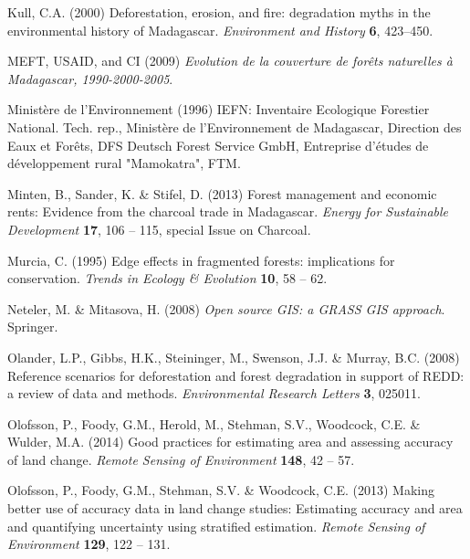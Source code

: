 \documentclass[a4paper, 12pt, leqno]{article} %
\begin{document}
\begin{thebibliography}{60}
Kull, C.A. (2000) {Deforestation, erosion, and fire: degradation myths in the
  environmental history of Madagascar}. \emph{Environment and History}
  \textbf{6}, 423--450.

{MEFT, USAID, and CI} (2009) \emph{{Evolution de la couverture de forêts
  naturelles à Madagascar, 1990-2000-2005}}.

{Ministère de l'Environnement} (1996) {IEFN: Inventaire Ecologique Forestier
  National}. Tech. rep., {Ministère de l'Environnement de Madagascar,
  Direction des Eaux et Forêts, DFS Deutsch Forest Service GmbH, Entreprise
  d'études de développement rural "Mamokatra", FTM}.

Minten, B., Sander, K. \& Stifel, D. (2013) {Forest management and economic
  rents: Evidence from the charcoal trade in Madagascar}. \emph{Energy for
  Sustainable Development} \textbf{17}, 106 -- 115, special Issue on Charcoal.

Murcia, C. (1995) Edge effects in fragmented forests: implications for
  conservation. \emph{Trends in Ecology \& Evolution} \textbf{10}, 58 -- 62.

Neteler, M. \& Mitasova, H. (2008) \emph{{Open source GIS: a GRASS GIS
  approach}}. Springer.

Olander, L.P., Gibbs, H.K., Steininger, M., Swenson, J.J. \& Murray, B.C.
  (2008) {Reference scenarios for deforestation and forest degradation in
  support of REDD: a review of data and methods}. \emph{Environmental Research
  Letters} \textbf{3}, 025011.

Olofsson, P., Foody, G.M., Herold, M., Stehman, S.V., Woodcock, C.E. \& Wulder,
  M.A. (2014) Good practices for estimating area and assessing accuracy of land
  change. \emph{Remote Sensing of Environment} \textbf{148}, 42 -- 57.

Olofsson, P., Foody, G.M., Stehman, S.V. \& Woodcock, C.E. (2013) Making better
  use of accuracy data in land change studies: Estimating accuracy and area and
  quantifying uncertainty using stratified estimation. \emph{Remote Sensing of
  Environment} \textbf{129}, 122 -- 131.


\end{thebibliography}
\end{document}
